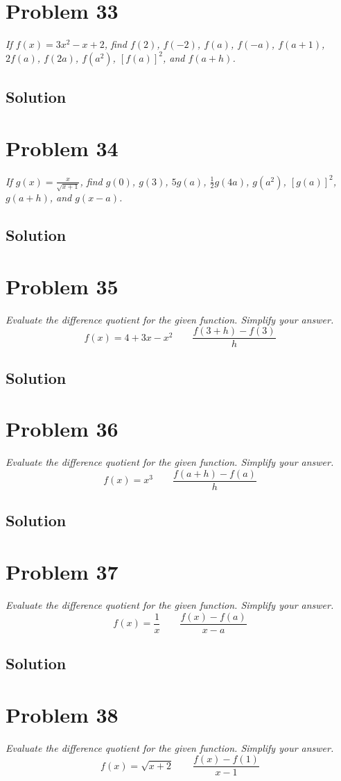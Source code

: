 \documentclass[11pt]{article}
\newcommand{\soln}{\subsection*}
\newcommand{\qn}{\textit}
\begin{document}
\section*{Problem 33}

\qn{If $f(x)=3x^2-x+2$, find $f(2)$, $f(-2)$, $f(a)$, $f(-a)$, $f(a+1)$, $2f(a)$, $f(2a)$, $f(a^2)$, $[f(a)]^2$, and $f(a+h)$.}

\soln{Solution}

\section*{Problem 34}

\qn{If $g(x)=\frac{x}{\sqrt{x+1}}$, find $g(0)$, $g(3)$, $5g(a)$, $\frac{1}{2}g(4a)$, $g(a^2)$, $[g(a)]^2$, $g(a+h)$, and $g(x-a)$.}

\soln{Solution}

\section*{Problem 35}

\qn{Evaluate the difference quotient for the given function. Simplify your answer. $$f(x)=4+3x-x^2 \qquad \frac{f(3+h)-f(3)}{h}$$}

\soln{Solution}

\section*{Problem 36}

\qn{Evaluate the difference quotient for the given function. Simplify your answer. $$f(x)=x^3 \qquad \frac{f(a+h)-f(a)}{h}$$}

\soln{Solution}

\section*{Problem 37}

\qn{Evaluate the difference quotient for the given function. Simplify your answer. $$f(x)=\frac{1}{x} \qquad \frac{f(x)-f(a)}{x-a}$$}

\soln{Solution}

\section*{Problem 38}

\qn{Evaluate the difference quotient for the given function. Simplify your answer. $$f(x)=\sqrt{x+2} \qquad \frac{f(x)-f(1)}{x-1}$$}
\end{document}
